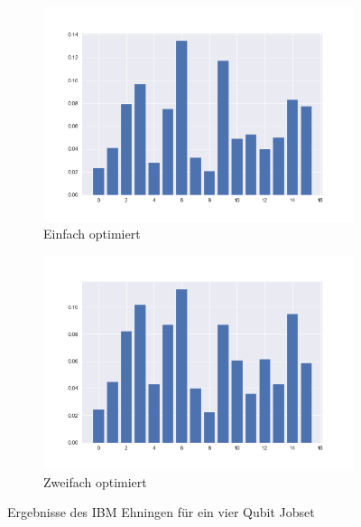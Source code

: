 \begin{figure}[H]
        \centering
        \begin{subfigure}{0.49\textwidth}
            \centering
            \includegraphics[width=1\linewidth]{images/IBM_small_1opt.png}
            \caption[]%
            {{\small Einfach optimiert}}    
            \label{fig:IBM1opt}
        \end{subfigure}
        \hfill
        \begin{subfigure}{0.49\textwidth}
            \centering 
            \includegraphics[width=1\linewidth]{images/IBM_small_2opt.png}
            \caption[]%
            {{\small Zweifach optimiert}}    
            \label{fig:IBM2opt}
        \end{subfigure}
        \caption[]%
        {{\small Ergebnisse des IBM Ehningen für ein vier Qubit Jobset}} 
        \label{fig:IBM-Sm-Res}
    \end{figure}


